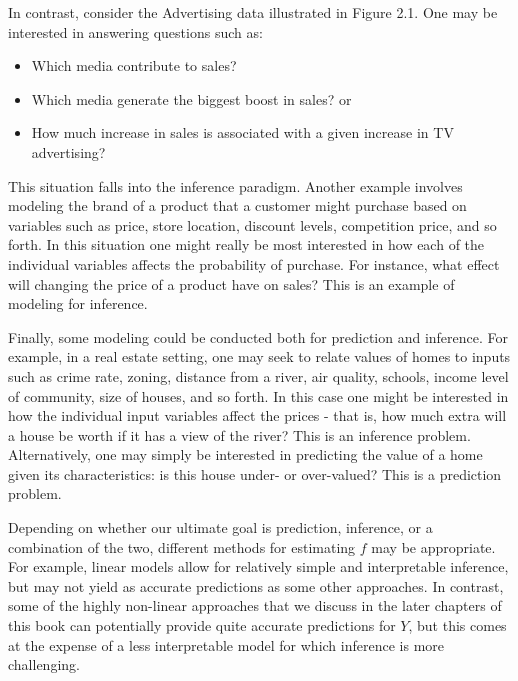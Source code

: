 \documentclass[10pt]{article}
\begin{document}
In contrast, consider the Advertising data illustrated in Figure 2.1. One may be interested in answering questions such as:

\begin{itemize}
  \item Which media contribute to sales?
  \item Which media generate the biggest boost in sales? or
  \item How much increase in sales is associated with a given increase in TV advertising?
\end{itemize}

This situation falls into the inference paradigm. Another example involves modeling the brand of a product that a customer might purchase based on variables such as price, store location, discount levels, competition price, and so forth. In this situation one might really be most interested in how each of the individual variables affects the probability of purchase. For instance, what effect will changing the price of a product have on sales? This is an example of modeling for inference.

Finally, some modeling could be conducted both for prediction and inference. For example, in a real estate setting, one may seek to relate values of homes to inputs such as crime rate, zoning, distance from a river, air quality, schools, income level of community, size of houses, and so forth. In this case one might be interested in how the individual input variables affect the prices - that is, how much extra will a house be worth if it has a view of the river? This is an inference problem. Alternatively, one may simply be interested in predicting the value of a home given its characteristics: is this house under- or over-valued? This is a prediction problem.

Depending on whether our ultimate goal is prediction, inference, or a combination of the two, different methods for estimating $f$ may be appropriate. For example, linear models allow for relatively simple and interpretable inference, but may not yield as accurate predictions as some other approaches. In contrast, some of the highly non-linear approaches that we discuss in the later chapters of this book can potentially provide quite accurate predictions for $Y$, but this comes at the expense of a less interpretable model for which inference is more challenging.

\end{document}
